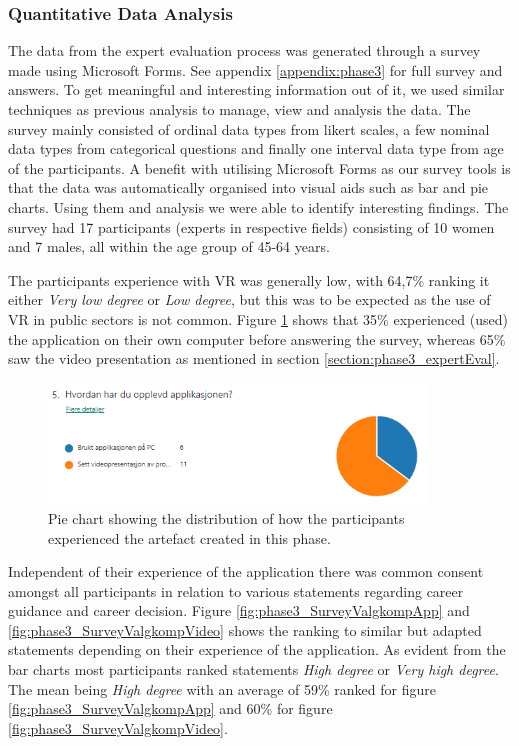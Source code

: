 \subsubsection{Quantitative Data Analysis}
The data from the expert evaluation process was generated through a survey made using Microsoft Forms. See appendix \ref{appendix:phase3} for full survey and answers. To get meaningful and interesting information out of it, we used similar techniques as previous analysis to manage, view and analysis the data. The survey mainly consisted of ordinal data types from likert scales, a few nominal data types from categorical questions and finally one interval data type from age of the participants.  
A benefit with utilising Microsoft Forms as our survey tools is that the data was automatically organised into visual aids such as bar and pie charts. Using them and analysis we were able to identify interesting findings. 
The survey had 17 participants (experts in respective fields) consisting of 10 women and 7 males, all within the age group  of 45-64 years. 


The participants experience with VR was generally low, with 64,7\% ranking it either \textit{Very low degree} or \textit{Low degree}, but this was to be expected as the use of VR in public sectors is not common. Figure \ref{fig:phase3_SurveyUseApp} shows that 35\% experienced (used) the application on their own computer before answering the survey, whereas 65\% saw the video presentation as mentioned in section \ref{section:phase3_expertEval}.  



\begin{figure}[H]
  \centering
   \captionsetup{width=.8\linewidth}
    \includegraphics[width=0.9\textwidth]{fig/phase_3/survey/useOfApp.PNG}
 \caption{Pie chart showing the distribution of how the participants experienced the artefact created in this phase.}
\label{fig:phase3_SurveyUseApp}
\end{figure}

Independent of their experience of the application there was common consent amongst all participants in relation to various statements regarding career guidance and career decision. Figure \ref{fig:phase3_SurveyValgkompApp} and \ref{fig:phase3_SurveyValgkompVideo} shows the ranking to similar but adapted statements depending on their experience of the application. As evident from the bar charts most participants ranked statements \textit{High degree} or \textit{Very high degree}. The mean being \textit{High degree} with an average of 59\% ranked for figure \ref{fig:phase3_SurveyValgkompApp} and 60\% for figure \ref{fig:phase3_SurveyValgkompVideo}.

